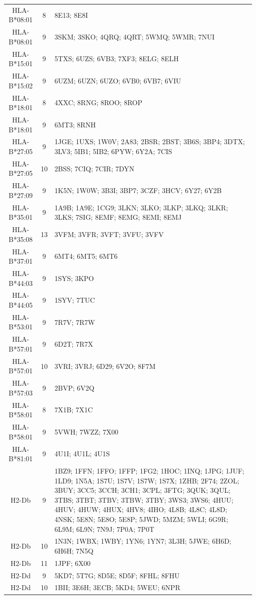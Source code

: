 \begin{table}[ht]
{\begin{tabular}{c c p{15cm}}
HLA-B*08:01 & 8 & 8E13; 8E8I \\
HLA-B*08:01 & 9 & 3SKM; 3SKO; 4QRQ; 4QRT; 5WMQ; 5WMR; 7NUI \\
HLA-B*15:01 & 9 & 5TXS; 6UZS; 6VB3; 7XF3; 8ELG; 8ELH \\
HLA-B*15:02 & 9 & 6UZM; 6UZN; 6UZO; 6VB0; 6VB7; 6VIU \\
HLA-B*18:01 & 8 & 4XXC; 8RNG; 8ROO; 8ROP \\
HLA-B*18:01 & 9 & 6MT3; 8RNH \\
HLA-B*27:05 & 9 & 1JGE; 1UXS; 1W0V; 2A83; 2BSR; 2BST; 3B6S; 3BP4; 3DTX; 3LV3; 5IB1; 5IB2; 6PYW;
6Y2A; 7CIS \\
HLA-B*27:05 & 10 & 2BSS; 7CIQ; 7CIR; 7DYN \\
HLA-B*27:09 & 9 & 1K5N; 1W0W; 3B3I; 3BP7; 3CZF; 3HCV; 6Y27; 6Y2B \\
HLA-B*35:01 & 9 & 1A9B; 1A9E; 1CG9; 3LKN; 3LKO; 3LKP; 3LKQ; 3LKR; 3LKS; 7SIG; 8EMF; 8EMG; 8EMI; 8EMJ
\\
HLA-B*35:08 & 13 & 3VFM; 3VFR; 3VFT; 3VFU; 3VFV \\
HLA-B*37:01 & 9 & 6MT4; 6MT5; 6MT6 \\
HLA-B*44:03 & 9 & 1SYS; 3KPO \\
HLA-B*44:05 & 9 & 1SYV; 7TUC \\
HLA-B*53:01 & 9 & 7R7V; 7R7W \\
HLA-B*57:01 & 9 & 6D2T; 7R7X \\
HLA-B*57:01 & 10 & 3VRI; 3VRJ; 6D29; 6V2O; 8F7M \\
HLA-B*57:03 & 9 & 2BVP; 6V2Q \\
HLA-B*58:01 & 8 & 7X1B; 7X1C \\
HLA-B*58:01 & 9 & 5VWH; 7WZZ; 7X00 \\
HLA-B*81:01 & 9 & 4U1I; 4U1L; 4U1S \\
H2-Db & 9 & 1BZ9; 1FFN; 1FFO; 1FFP; 1FG2; 1HOC; 1INQ; 1JPG; 1JUF; 1LD9; 1N5A; 1S7U; 1S7V; 1S7W;
1S7X; 1ZHB; 2F74; 2ZOL; 3BUY; 3CC5; 3CCH; 3CH1; 3CPL; 3FTG; 3QUK; 3QUL; 3TBS; 3TBT; 3TBV; 3TBW;
3TBY; 3WS3; 3WS6; 4HUU; 4HUV; 4HUW; 4HUX; 4HV8; 4IHO; 4L8B; 4L8C; 4L8D; 4NSK; 5E8N; 5E8O; 5E8P;
5JWD; 5MZM; 5WLI; 6G9R; 6L9M; 6L9N; 7N9J; 7P0A; 7P0T \\
H2-Db & 10 & 1N3N; 1WBX; 1WBY; 1YN6; 1YN7; 3L3H; 5JWE; 6H6D; 6H6H; 7N5Q \\
H2-Db & 11 & 1JPF; 6X00 \\
H2-Dd & 9 & 5KD7; 5T7G; 8D5E; 8D5F; 8FHL; 8FHU \\
H2-Dd & 10 & 1BII; 3E6H; 3ECB; 5KD4; 5WEU; 6NPR \\

\end{tabular}}
\end{table}
